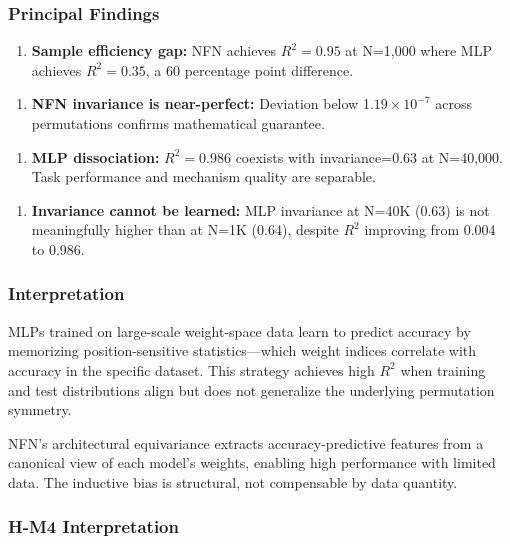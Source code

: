 
\subsubsection{Principal Findings}

\begin{enumerate}
\item \textbf{Sample efficiency gap:} NFN achieves $R^{2}=0.95$ at N=1,000 where MLP achieves $R^{2}=0.35$, a 60 percentage point difference.
\end{enumerate}

\begin{enumerate}
\item \textbf{NFN invariance is near-perfect:} Deviation below 1.$19\times 10^{-7}$ across permutations confirms mathematical guarantee.
\end{enumerate}

\begin{enumerate}
\item \textbf{MLP dissociation:} $R^{2}=0.986$ coexists with invariance=0.63 at N=40,000. Task performance and mechanism quality are separable.
\end{enumerate}

\begin{enumerate}
\item \textbf{Invariance cannot be learned:} MLP invariance at N=40K (0.63) is not meaningfully higher than at N=1K (0.64), despite $R^2$ improving from 0.004 to 0.986.
\end{enumerate}

\subsubsection{Interpretation}

MLPs trained on large-scale weight-space data learn to predict accuracy by memorizing position-sensitive statistics---which weight indices correlate with accuracy in the specific dataset. This strategy achieves high $R^2$ when training and test distributions align but does not generalize the underlying permutation symmetry.

NFN's architectural equivariance extracts accuracy-predictive features from a canonical view of each model's weights, enabling high performance with limited data. The inductive bias is structural, not compensable by data quantity.

\subsubsection{H-M4 Interpretation}

